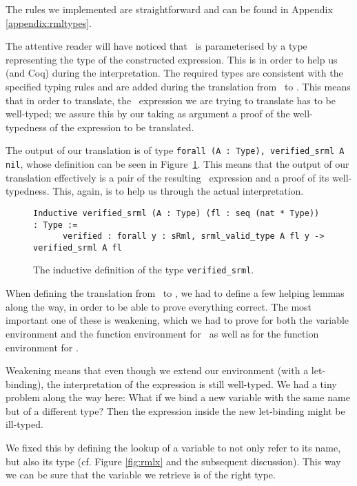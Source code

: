 \documentclass[11pt, leqno, titlepage]{article}
\def\coqe{\lstinline[language=Coq, basicstyle=\small]}
\theoremstyle{definition}
\begin{document}
The rules we implemented are straightforward and can be found in Appendix
\ref{appendix:rmltypes}. 

The attentive reader will have noticed that \srml\ is parameterised by a type
representing the type of the constructed expression. This is in order to help us (and
Coq) during the interpretation. The required types are consistent with the specified
typing rules and are added during the translation from \rmlx\ to \srml. 
This means that in order to translate, the \rmlx\ expression we are trying to
translate has to be well-typed; we assure this by our taking as argument a proof of
the well-typedness of the expression to be translated.

The output of our translation is of type \coqe{forall (A : Type), verified_srml A nil},
whose definition can be seen in Figure~\ref{fig:verified-srml}. This means that the
output of our translation effectively is a pair of the resulting \srml\ expression
and a proof of its well-typedness. This, again, is to help us through the actual
interpretation. 

\begin{figure}[h]
  \centering
\begin{lstlisting}[language=coq]
  Inductive verified_srml (A : Type) (fl : seq (nat * Type)) : Type :=
      verified : forall y : sRml, srml_valid_type A fl y -> verified_srml A fl
\end{lstlisting}
  \caption{The inductive definition of the type \coqe{verified_srml}.}
  \label{fig:verified-srml}
\end{figure}

When defining the translation from \rmlx\ to \srml, we had to define a few helping
lemmas along the way, in order to be able to prove everything correct. The most
important one of these is weakening, which we had to prove for both the variable
environment and the function environment for \rmlx\ as well as for the function
environment for \srml.

Weakening means that even though we extend our environment (with a let-binding), the
interpretation of the expression is still well-typed.
We had a tiny problem along the way here: What if we bind a new variable with the
same name but of a different type? Then the expression inside the new let-binding
might be ill-typed.

We fixed this by defining the lookup of a variable to not only refer to its name, but
also its type (cf. Figure \ref{fig:rmlx} and the subsequent discussion). This way we
can be sure that the variable we retrieve is of the right type.  
\end{document}

